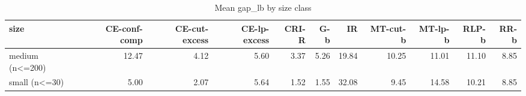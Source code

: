 \begin{table}[htbp]
\centering
\small
\caption{Mean gap\_lb by size class}
\label{tab:E2b_head_to_head_budgets_b1_by_size}
\begin{tabular}{lrrrrrrrrrr}
\toprule
size & CE-conf-comp & CE-cut-excess & CE-lp-excess & CRI-R & G-b & IR & MT-cut-b & MT-lp-b & RLP-b & RR-b \\
\midrule
medium (n<=200) & 12.47 & 4.12 & 5.60 & 3.37 & 5.26 & 19.84 & 10.25 & 11.01 & 11.10 & 8.85 \\
small (n<=30) & 5.00 & 2.07 & 5.64 & 1.52 & 1.55 & 32.08 & 9.45 & 14.58 & 10.21 & 8.85 \\
\bottomrule
\end{tabular}
\end{table}
